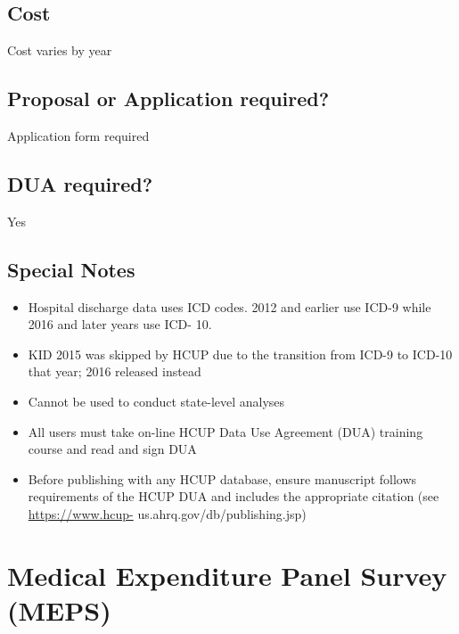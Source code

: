 \documentclass[
]{book}
\providecommand{\tightlist}{%
  \setlength{\itemsep}{0pt}\setlength{\parskip}{0pt}}
\begin{document}
\hypertarget{cost-36}{%
\section{Cost}\label{cost-36}}

Cost varies by year

\hypertarget{proposal-or-application-required-36}{%
\section{Proposal or Application required?}\label{proposal-or-application-required-36}}

Application form required

\hypertarget{dua-required-36}{%
\section{DUA required?}\label{dua-required-36}}

Yes

\hypertarget{special-notes-36}{%
\section{Special Notes}\label{special-notes-36}}

\begin{itemize}
\tightlist
\item
  Hospital discharge data uses ICD codes. 2012 and earlier use ICD-9 while 2016 and later years use ICD- 10.
\item
  KID 2015 was skipped by HCUP due to the transition from ICD-9 to ICD-10 that year; 2016 released instead
\item
  Cannot be used to conduct state-level analyses
\item
  All users must take on-line HCUP Data Use Agreement (DUA) training course and read and sign DUA
\item
  Before publishing with any HCUP database, ensure manuscript follows requirements of the HCUP DUA and includes the appropriate citation (see \url{https://www.hcup-} us.ahrq.gov/db/publishing.jsp)
\end{itemize}

\mainmatter

\hypertarget{medical-expenditure-panel-survey-meps}{%
\chapter{Medical Expenditure Panel Survey (MEPS)}\label{medical-expenditure-panel-survey-meps}}
\end{document}
